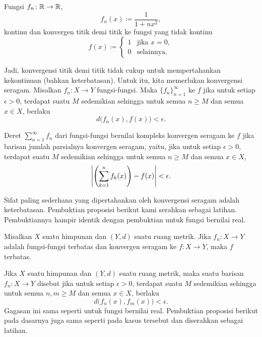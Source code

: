 \begin{example}
Fungsi $f_n \colon {\mathbb{R}} \to {\mathbb{R}}$,
\begin{equation*}
f_n(x) \coloneqq \frac{1}{1+nx^2},
\end{equation*}
kontinu dan konvergen titik demi titik ke fungsi yang tidak kontinu
\begin{equation*}
f(x) \coloneqq 
\begin{cases}
1 & \text{jika } x=0, \\
0 & \text{selainnya.}
\end{cases}
\end{equation*}
\end{example}

Jadi, konvergensi titik demi titik tidak cukup untuk mempertahankan kekontinuan
(bahkan keterbatasan). Untuk itu, kita memerlukan konvergensi seragam.
Misalkan $f_n \colon X \to Y$ fungsi-fungsi. Maka
$\{f_n\}_{n=1}^\infty$ \emph{}
ke $f$ jika
untuk setiap $\epsilon > 0$, terdapat suatu $M$ sedemikian sehingga
untuk semua $n \geq M$ dan semua $x \in X$, berlaku
\begin{equation*}
d\bigl(f_n(x),f(x)\bigr) < \epsilon .
\end{equation*}

Deret $\sum_{n=1}^\infty f_n$ dari fungsi-fungsi bernilai kompleks konvergen seragam
ke $f$ jika barisan
jumlah parsialnya konvergen seragam, yaitu, jika untuk setiap $\epsilon > 0$,
terdapat suatu $M$ sedemikian sehingga
untuk semua $n \geq M$ dan semua $x \in X$,
\begin{equation*}
\left\lvert {\left(\sum_{k=1}^n f_k(x)\right)-f(x)} \right\rvert < \epsilon .
\end{equation*}

Sifat paling sederhana yang dipertahankan oleh konvergensi seragam adalah
keterbatasan. Pembuktian proposisi berikut kami serahkan sebagai
latihan. Pembuktiannya hampir identik dengan pembuktian untuk fungsi bernilai real.

\begin{prop} \label{prop:uniformconvbounded}
Misalkan $X$ suatu himpunan dan $(Y,d)$ suatu ruang metrik.
Jika $f_n \colon X \to Y$ adalah fungsi-fungsi terbatas dan konvergen seragam ke $f
\colon X \to Y$, maka $f$ terbatas.
\end{prop}

Jika $X$ suatu himpunan dan $(Y,d)$ suatu ruang metrik, maka suatu barisan $f_n \colon X
\to Y$ disebut \emph{} jika untuk setiap $\epsilon > 0$, terdapat suatu $M$ sedemikian sehingga
untuk semua $n, m \geq M$ dan semua $x \in X$, berlaku
\begin{equation*}
d\bigl(f_n(x),f_m(x)\bigr) < \epsilon .
\end{equation*}
Gagasan ini sama seperti untuk fungsi bernilai real.
Pembuktian proposisi berikut
pada dasarnya juga sama seperti pada kasus tersebut dan
diserahkan sebagai latihan.

